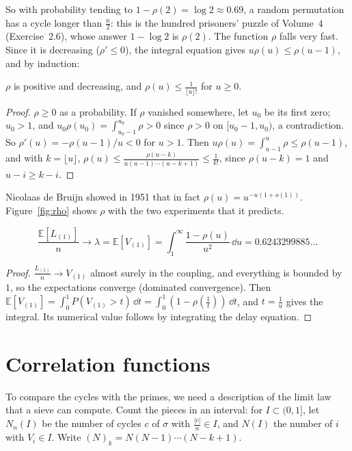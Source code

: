 So with probability tending to $1-\rho(2)=\log2\approx0.69$, a random permutation has a cycle longer than $\frac n2$: this is the hundred prisoners' puzzle of Volume~4 (Exercise~2.6), whose answer $1-\log2$ is $\rho(2)$. The function $\rho$ falls very fast. Since it is
decreasing ($\rho'\le0$), the integral equation gives $u\rho(u)\le\rho(u-1)$, and by induction:

\begin{proposition}\label{prop:rhobound}
$\rho$ is positive and decreasing, and $\rho(u)\le\frac1{\lfloor u\rfloor!}$ for $u\ge0$.
\end{proposition}
\begin{proof}
$\rho\ge0$ as a probability. If $\rho$ vanished somewhere, let $u_0$ be its first zero; $u_0>1$, and $u_0\rho(u_0)=\int_{u_0-1}^{u_0}\rho>0$ since $\rho>0$ on $[u_0-1,u_0)$, a contradiction. So $\rho'(u)=-\rho(u-1)/u<0$ for $u>1$. Then $u\rho(u)=\int_{u-1}^u\rho\le\rho(u-1)$, and with
$k=\lfloor u\rfloor$, $\rho(u)\le\frac{\rho(u-k)}{u(u-1)\cdots(u-k+1)}\le\frac1{k!}$, since $\rho(u-k)=1$ and $u-i\ge k-i$.
\end{proof}

Nicolaas de Bruijn showed in 1951 that in fact $\rho(u)=u^{-u(1+o(1))}$. Figure~\ref{fig:rho} shows $\rho$ with the two experiments that it predicts.

\begin{corollary}\label{cor:golomb}
\[
\frac{\mathbb E[L_{(1)}]}n\longrightarrow\lambda=\mathbb E[V_{(1)}]=\int_1^\infty\frac{1-\rho(u)}{u^2}\,\dd u=0.6243299885\ldots
\]
\end{corollary}
\begin{proof}
$\frac{L_{(1)}}n\to V_{(1)}$ almost surely in the coupling, and everything is bounded by $1$, so the expectations converge (dominated convergence). Then $\mathbb E[V_{(1)}]=\int_0^1P(V_{(1)}>t)\,\dd t=\int_0^1(1-\rho(\frac1t))\,\dd t$, and $t=\frac1u$ gives the integral. Its numerical value follows by integrating the delay equation.
\end{proof}

\section{Correlation functions}

To compare the cycles with the primes, we need a description of the limit law that a sieve can compute. Count the pieces in an interval: for $I\subset(0,1]$, let $N_n(I)$ be the number of cycles $c$ of $\sigma$ with $\frac{|c|}n\in I$, and $N(I)$ the number of $i$ with $V_i\in I$.
Write $(N)_k=N(N-1)\cdots(N-k+1)$.

